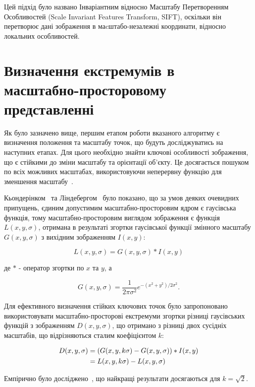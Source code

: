 Цей підхід було названо Інваріантним відносно Масштабу Перетворенням Особливостей (Scale Invariant Features Transform, SIFT), оскільки він перетворює дані зображення в маcштабо-незалежні координати, відносно локальних особливостей.

\section{Визначення екстремумів в масштабно-просторовому представленні}
\label{sec:sift scale space extrema}

Як було зазначено вище, першим етапом роботи вказаного алгоритму є визначення положення та масштабу точок, що будуть досліджуватись на наступних етапах. Для цього необхідно знайти ключові особливості зображення, що є стійкими до зміни масштабу та орієнтації об'єкту. Це досягається пошуком по всіх можливих масштабах, використовуючи неперервну функцію для зменшення масштабу~\cite{Witkin83}. 

Кьондерінком~\cite{Koenderink84} та Ліндебергом~\cite{Lindeberg94scale-spacetheory} було показано, що за умов деяких очевидних припущень, єдиним допустимим масштабно-просторовим ядром є гаусівська функція, тому масштабно-просторовим виглядом зображення є функція $L(x, y, \sigma)$, отримана в результаті згортки гаусівської функції змінного масштабу $G(x,y,\sigma)$ з вихідним зображенням $I(x,y)$:

\[
L(x,y,\sigma) = G(x,y,\sigma) \ast I(x,y)
\]

де $\ast$ - оператор згортки по $x$ та $y$, а

\[
  G(x,y,\sigma) = \frac{1}{2\pi\sigma^2}e^{-(x^2+y^2)/2\sigma^2}.
\]

Для ефективного визначення стійких ключових точок було запропоновано~\cite{Lowe99objectrec} використовувати масштабно-просторові екстремуми згортки різниці гаусівських функцій з зображенням $D(x,y,\sigma)$, що отримано з різниці двох сусідніх масштабів, що відрізняються сталим коефіцієнтом $k$:

\begin{align}
  \label{eq:dog-scale}
    D(x,y,\sigma) & = (G(x,y,k\sigma) - G(x,y,\sigma)) \ast I(x,y) \notag\\
                  & = L(x,y,k\sigma) - L(x,y,\sigma)
\end{align}


Емпірично було досліджено~\cite{Lowe2004}, що найкращі результати досягаються для $k=\sqrt2$.

